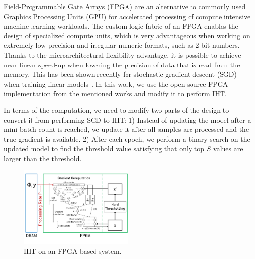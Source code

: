 \documentclass{article}
\begin{document}
Field-Programmable Gate Arrays (FPGA) are an alternative to commonly used Graphics Processing Units (GPU) for accelerated processing of compute intensive machine learning workloads. The custom logic fabric of an FPGA enables the design of specialized compute units, which is very advantageous when working on extremely low-precision and irregular numeric formats, such as 2 bit numbers. Thanks to the microarchitectural flexibility advantage, it is possible to achieve near linear speed-up when lowering the precision of data that is read from the memory. This has been shown recently for stochastic gradient descent (SGD) when training linear models~\cite{zhang2017zipml, kara2017fpga}. In this work, we use the open-source FPGA implementation from the mentioned works and modify it to perform IHT.

In terms of the computation, we need to modify two parts of the design to convert it from performing SGD to IHT: 1) Instead of updating the model after a mini-batch count is reached, we update it after all samples are processed and the true gradient is available. 2) After each epoch, we perform a binary search on the updated model to find the threshold value satisfying that only top $S$ values are larger than the  threshold.

\begin{figure}[t!]
\centering
\includegraphics[width=0.5\textwidth, angle=0]{../figs/niht_fpga.pdf}
\caption{IHT on an FPGA-based system.}
\label{fig:fpga}
\end{figure}
\end{document}
